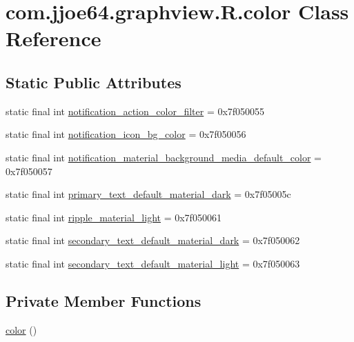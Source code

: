 \hypertarget{classcom_1_1jjoe64_1_1graphview_1_1_r_1_1color}{}\section{com.\+jjoe64.\+graphview.\+R.\+color Class Reference}
\label{classcom_1_1jjoe64_1_1graphview_1_1_r_1_1color}
\subsection*{Static Public Attributes}
\begin{DoxyCompactItemize}
\item 
static final int \mbox{\hyperlink{classcom_1_1jjoe64_1_1graphview_1_1_r_1_1color_a47b98feca837fc91ffd918924ef8bf05}{notification\+\_\+action\+\_\+color\+\_\+filter}} = 0x7f050055
\item 
static final int \mbox{\hyperlink{classcom_1_1jjoe64_1_1graphview_1_1_r_1_1color_ad4a6c51860b4a4364c58546da408a00e}{notification\+\_\+icon\+\_\+bg\+\_\+color}} = 0x7f050056
\item 
static final int \mbox{\hyperlink{classcom_1_1jjoe64_1_1graphview_1_1_r_1_1color_adafd794514950e1ac8c681b1efda4d4c}{notification\+\_\+material\+\_\+background\+\_\+media\+\_\+default\+\_\+color}} = 0x7f050057
\item 
static final int \mbox{\hyperlink{classcom_1_1jjoe64_1_1graphview_1_1_r_1_1color_af816aa8e8208d7a7f1eeb9200b9995e8}{primary\+\_\+text\+\_\+default\+\_\+material\+\_\+dark}} = 0x7f05005c
\item 
static final int \mbox{\hyperlink{classcom_1_1jjoe64_1_1graphview_1_1_r_1_1color_ae45689bd73a1045de9235a42728bcacb}{ripple\+\_\+material\+\_\+light}} = 0x7f050061
\item 
static final int \mbox{\hyperlink{classcom_1_1jjoe64_1_1graphview_1_1_r_1_1color_a7cfffa4f62e58892e15d86a691aece2b}{secondary\+\_\+text\+\_\+default\+\_\+material\+\_\+dark}} = 0x7f050062
\item 
static final int \mbox{\hyperlink{classcom_1_1jjoe64_1_1graphview_1_1_r_1_1color_ac5da7af8d455e93b3263c1f7c0f1cf66}{secondary\+\_\+text\+\_\+default\+\_\+material\+\_\+light}} = 0x7f050063
\end{DoxyCompactItemize}
\subsection*{Private Member Functions}
\begin{DoxyCompactItemize}
\item 
\mbox{\hyperlink{classcom_1_1jjoe64_1_1graphview_1_1_r_1_1color_ac6f5283346847dbf4143f6a0605c87e2}{color}} ()
\end{DoxyCompactItemize}


